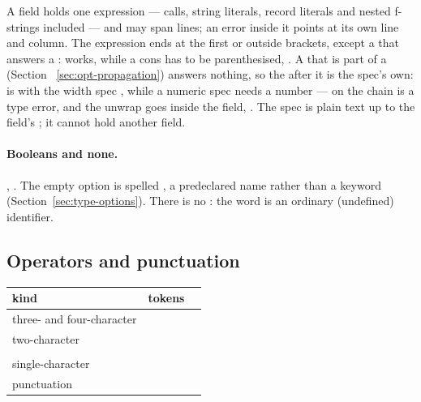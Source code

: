 A field holds one expression --- calls, string literals, record literals
and nested f-strings included --- and may span lines; an error inside it
points at its own line and column. The expression ends at the first
\ic{\}} or \ic{:} outside brackets, except a \ic{:} that answers a
:  works, while a cons has to be parenthesised,
. A  that is part of a  (Section~
\ref{sec:opt-propagation}) answers nothing, so the \ic{:} after it is
the spec's own:  is  with the width
spec , while a numeric spec needs a number ---  on the
 chain is a type error, and the unwrap goes inside the field,
. The spec
is plain text up to the field's \ic{\}}; it cannot hold another field.

\paragraph{Booleans and none.} , . The empty option
is spelled , a predeclared name rather than a keyword
(Section~\ref{sec:type-options}). There is no : the word is an
ordinary (undefined) identifier.

\subsection{Operators and punctuation}

\begin{center}
\begin{tabular}{lll}
\toprule
kind & tokens \\
\midrule
three- and four-character &
  \ic{>{}>{}>} \ic{<{}<=} \ic{>{}>=} \ic{>{}>{}>=} \\
two-character &
  \ic{==} \ic{!=} \ic{<=} \ic{>=} \ic{\&\&} \ic{||} \ic{::} \ic{..}
  \ic{->} \ic{=>} \ic{++} \ic{--} \ic{<{}<} \ic{>{}>} \ic{?.} \\
 &
  \ic{+=} \ic{-=} \ic{*=} \ic{/=} \ic{\%=}
  \ic{\&=} \ic{|=} \ic{\textasciicircum{}=} \\
single-character &
  \ic{+} \ic{-} \ic{*} \ic{/} \ic{\%} \ic{<} \ic{>} \ic{=} \ic{!}
  \ic{\&} \ic{.} \ic{?} \ic{|} \ic{\textasciicircum{}} \ic{\textasciitilde{}} \\
punctuation &
  \ic{(} \ic{)} \ic{\{} \ic{\}} \ic{[} \ic{]} \ic{,} \ic{;} \ic{:} \\
\bottomrule
\end{tabular}
\end{center}

